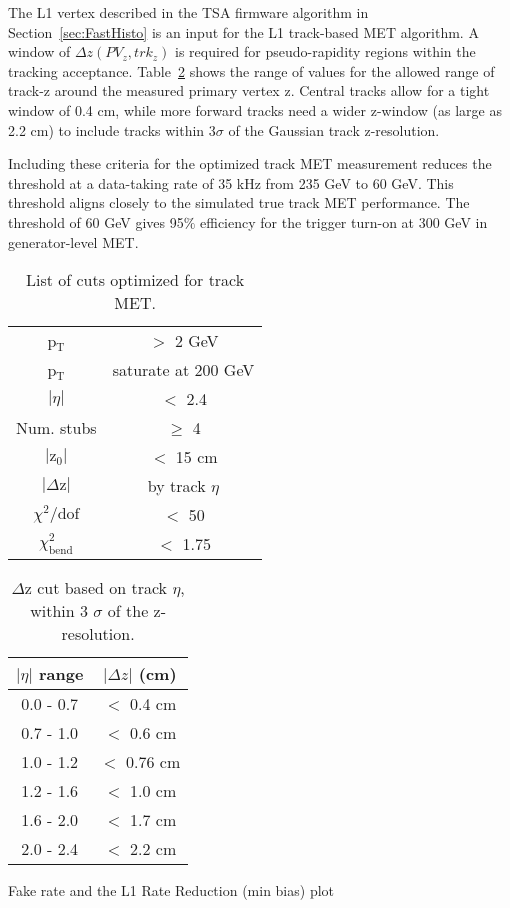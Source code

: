 The L1 vertex described in the TSA firmware algorithm in Section~\ref{sec:FastHisto} is an input for the L1 track-based MET algorithm. A window of $\Delta z\left(PV_{z}, trk_{z}\right)$ is required for pseudo-rapidity regions within the tracking acceptance. Table~\ref{tab:tkMETDeltaz} shows the range of values for the allowed range of track-z around the measured primary vertex z. Central tracks allow for a tight window of 0.4 cm, while more forward tracks need a wider z-window (as large as 2.2 cm) to include tracks within $3\sigma$ of the Gaussian track z-resolution.

Including these criteria for the optimized track MET measurement reduces the threshold at a data-taking rate of 35 kHz from 235 GeV to 60 GeV. This threshold aligns closely to the simulated true track MET performance. The threshold of 60 GeV gives 95$\%$ efficiency for the trigger turn-on at 300 GeV in generator-level MET.


\begin{table}
\centering
\label{tab:tkMETcuts}
\caption{List of cuts optimized for track MET.}
\begin{tabular}{ |c|c| }
\hline
p$_\textrm{T}$  & $>$ 2 GeV \\
p$_\textrm{T}$ & saturate at 200 GeV \\
$|\eta|$  & $<$ 2.4 \\
Num. stubs  & $\geq$ 4 \\
$|\textrm{z}_{0}|$  & $<$ 15 cm \\
$|\Delta \textrm{z}|$  & by track $\eta$ \\
$\chi^{2}/\textrm{dof}$ & $<$ 50 \\
$\chi^{2}_{\textrm{bend}}$ & $<$ 1.75 \\
\hline
\end{tabular}
\end{table}

\begin{table}
\centering
\label{tab:tkMETDeltaz}
\caption{$\Delta$z cut based on track $\eta$, within 3 $\sigma$ of the z-resolution.}
\begin{tabular}{ |c|c| }
\hline
$|\eta|$ range & $|\Delta z|$ (cm) \\
\hline
0.0 - 0.7 & $<$ 0.4 cm \\
0.7 - 1.0 & $<$ 0.6 cm \\
1.0 - 1.2 & $<$ 0.76 cm \\
1.2 - 1.6 & $<$ 1.0 cm \\
1.6 - 2.0 & $<$ 1.7 cm \\
2.0 - 2.4 & $<$ 2.2 cm \\

\hline
\end{tabular}
\end{table}

Fake rate and the L1 Rate Reduction (min bias) plot
